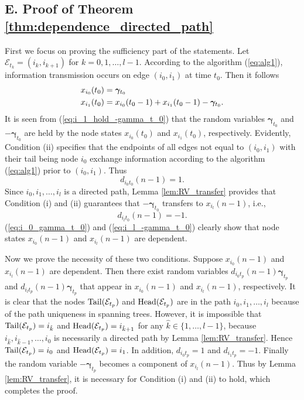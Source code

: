 \documentclass[a4paper, 11pt]{article}
\newcommand{\1}{\mathbf{1}}
\newcommand{\asf}{\mathcal{E}}
\newcommand{\Head}{\textnormal{Head}}
\newcommand{\Tail}{\textnormal{Tail}}
\newcommand{\gammab}{{\bm \gamma}}
\begin{document}
\subsection*{E. Proof of Theorem \ref{thm:dependence_directed_path}}
First we focus on   proving the sufficiency part of the statements. Let $\asf_{t_k}=(i_k,i_{k+1})$ for $k=0,1,\dots,l-1$. According to the algorithm (\ref{eq:alg1}), information transmission occurs on edge $(i_0,i_1)$ at time $t_0$. Then it follows
\begin{align}
x_{i_0}(t_0) &= \gammab_{t_0}\notag\\
x_{i_1}(t_0) &= x_{i_0}(t_0-1) + x_{i_1}(t_0-1) - \gammab_{t_0}. \label{eq:i_1_hold_-gamma_t_0}
\end{align}
It is seen from (\ref{eq:i_1_hold_-gamma_t_0}) that the random variables $\gammab_{t_0}$ and $-\gammab_{t_0}$ are held by the node states $x_{i_0}(t_0)$ and $x_{i_1}(t_0)$, respectively. Evidently, Condition (ii) specifies that the endpoints of all edges not equal to $(i_0,i_1)$ with their tail being node $i_0$ exchange information according to the algorithm (\ref{eq:alg1}) prior to $(i_0,i_1)$. Thus
\begin{equation}\label{eq:i_0_gamma_t_0}
d_{i_0 t_0}(n-1 )=1.
\end{equation}
Since $i_0,i_1,\dots,i_l$ is a directed path, Lemma \ref{lem:RV_transfer} provides that Condition (i) and (ii) guarantees that $-\gammab_{t_0}$ transfers to $x_{i_l}(n-1 )$, i.e.,
\begin{equation}\label{eq:i_l_-gamma_t_0}
d_{i_l t_0}(n-1 )=-1.
\end{equation}
(\ref{eq:i_0_gamma_t_0}) and (\ref{eq:i_l_-gamma_t_0}) clearly show that node states $x_{i_0}(n-1 )$ and $x_{i_l}(n-1 )$ are dependent.


Now we prove the necessity of these two conditions. Suppose $x_{i_0}(n-1 )$ and $x_{i_l}(n-1 )$ are dependent. Then there exist random variables $d_{i_0 t_p}(n-1 )\gammab_{t_p}$ and $d_{i_l t_p}(n-1 )\gammab_{t_p}$ that appear in $x_{i_0}(n-1 )$ and $x_{i_l}(n-1 )$, respectively. It is clear that the nodes $\Tail(\asf_{t_p})$ and $\Head(\asf_{t_p})$ are in the path $i_0,i_1,\dots,i_l$ because of the path uniqueness in spanning trees. However, it is impossible that $\Tail(\asf_{t_p})=i_{\hat{k}}$ and $\Head(\asf_{t_p})=i_{\hat{k}+1}$ for any $\hat{k}\in\{1,\dots,l-1\}$, because $i_{\hat{k}},i_{\hat{k}-1},\dots,i_0$ is necessarily a directed path by Lemma \ref{lem:RV_transfer}. Hence $\Tail(\asf_{t_p})=i_0$ and $\Head(\asf_{t_p})=i_1$. In addition, $d_{i_0 t_p}=1$ and $d_{i_1 t_p}=-1$. Finally the random variable $-\gammab_{t_p}$ becomes a component of $x_{i_l}(n-1 )$. Thus by Lemma \ref{lem:RV_transfer}, it is necessary for Condition (i) and (ii) to hold, which completes the proof.
\end{document}
